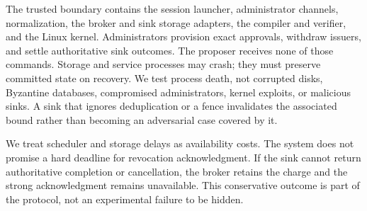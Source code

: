 The trusted boundary contains the session launcher, administrator channels,
normalization, the broker and sink storage adapters, the compiler and verifier,
and the Linux kernel. Administrators provision exact approvals, withdraw
issuers, and settle authoritative sink outcomes. The proposer receives none of
those commands. Storage and service processes may crash; they must preserve
committed state on recovery. We test process death, not corrupted disks,
Byzantine databases, compromised administrators, kernel exploits, or malicious
sinks. A sink that ignores deduplication or a fence invalidates the associated
bound rather than becoming an adversarial case covered by it.

We treat scheduler and storage delays as availability costs. The system does not
promise a hard deadline for revocation acknowledgment. If the sink cannot return
authoritative completion or cancellation, the broker retains the charge and the
strong acknowledgment remains unavailable. This conservative outcome is part of
the protocol, not an experimental failure to be hidden.
